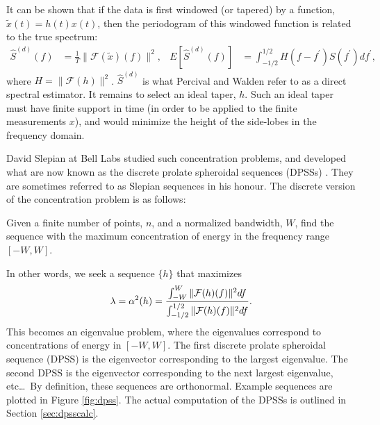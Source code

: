 It can be shown that if the data is first windowed (or tapered) by a function, $\tilde{x}(t)=h(t)x(t)$, then the periodogram of this windowed function is related to the true spectrum:
\begin{align}
    \hat{S}^{(d)}(f) & = \frac{1}{T}\|\mathcal{F}(\tilde{x})(f)\|^2, & E\left[\hat{S}^{(d)}(f)\right] & = \int_{-1/2}^{1/2}H(f-f^\prime)S(f^\prime)df^\prime,
\end{align}
where $H=\|\mathcal{F}(h)\|^2$.  $\hat{S}^{(d)}$ is what Percival and Walden \cite{percival:multitaper} refer to as a direct spectral estimator.  It remains to select an ideal taper, $h$.  Such an ideal taper must have finite support in time (in order to be applied to the finite measurements $x$), and would minimize the height of the side-lobes in the frequency domain.  

David Slepian at Bell Labs studied such concentration problems, and developed what are now known as the discrete prolate spheroidal sequences (DPSSs) \cite{slepian:seq}.  They are sometimes referred to as Slepian sequences in his honour.  The discrete version of the concentration problem is as follows:
\smallskip

\begin{problem}
    Given a finite number of points, $n$, and a normalized bandwidth, $W$, find the sequence with the maximum concentration of energy in the frequency range $[-W,W]$.  
\end{problem}
\smallskip

\noindent In other words, we seek a sequence $\{h\}$ that maximizes
\begin{align}
    \lambda = \alpha^2(h) = \dfrac{\int_{-W}^W \|\mathcal{F}(h)(f)\|^2df}{\int_{-1/2}^{1/2} \|\mathcal{F}(h)(f)\|^2 df}. \label{eq:conc}\index{discrete prolate spheroidal sequence (DPSS)!concentration problem}
\end{align}
This becomes an eigenvalue problem, where the eigenvalues correspond to concentrations of energy in $[-W,W]$.  The first discrete prolate spheroidal sequence (DPSS) is the eigenvector corresponding to the largest eigenvalue.  The second DPSS is the eigenvector corresponding to the next largest eigenvalue, etc\ldots\  By definition, these sequences are orthonormal.  Example sequences are plotted in Figure \ref{fig:dpss}.  The actual computation of the DPSSs is outlined in Section \ref{sec:dpsscalc}.

